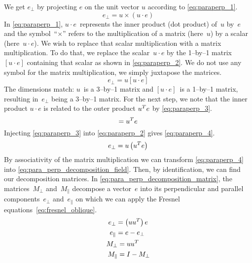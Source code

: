We get $e_\perp$ by projecting $e$ on the unit vector $u$ according to \cref{eq:paraperp_1}.
\begin{equation}
    e_\perp = u \times (u \cdot e) \label{eq:paraperp_1}
\end{equation}
In \cref{eq:paraperp_1}, $u \cdot e$~represents the inner product (dot product) of~$u$ by~$e$ and the symbol~``$\times$'' refers to the multiplication of a matrix (here~$u$) by a scalar (here~$u \cdot e$).
We wish to replace that scalar multiplication with a matrix multiplication.
To do that, we replace the scalar~$u \cdot e$ by the 1--by--1 matrix~$[u \cdot e]$ containing that scalar as shown in \cref{eq:paraperp_2}.
We do not use any symbol for the matrix multiplication, we simply juxtapose the matrices.
\begin{equation}
    e_\perp = u [u \cdot e] \label{eq:paraperp_2}
\end{equation}
The dimensions match: $u$~is a 3--by--1 matrix and $[u \cdot e]$~is a 1--by--1 matrix, resulting in~$e_\perp$ being a 3--by--1 matrix.
For the next step, we note that the inner product $u \cdot e$ is related to the outer product $u^T e$ by \cref{eq:paraperp_3}.
\begin{equation}
    [u \cdot e] = u\transp e \label{eq:paraperp_3}
\end{equation}
Injecting \cref{eq:paraperp_3} into \cref{eq:paraperp_2} gives \cref{eq:paraperp_4}.
\begin{equation}
    e_\perp = u \left( u^T e \right) \label{eq:paraperp_4}
\end{equation}
By associativity of the matrix multiplication we can transform \cref{eq:paraperp_4} into \cref{eq:para_perp_decomposition_field}.
Then, by identification, we can find our decomposition matrices.
In \cref{eq:para_perp_decomposition_matrix}, the matrices~$M_\perp$ and~$M_\parallel$ decompose a vector~$e$ into its perpendicular and parallel components~$e_\perp$ and~$e_\parallel$ on which we can apply the Fresnel equations~\eqref{eq:fresnel_oblique}.
\begin{gather}
    \begin{aligned}
        e_\perp &= \left(u u^T \right) e
        \\
        e_\parallel &= e - e_\perp
    \end{aligned}
    \label{eq:para_perp_decomposition_field}
    \\
    \begin{aligned}
        M_\perp &= u u^T   \\
        M_\parallel & = I - M_\perp
    \end{aligned}
    \label{eq:para_perp_decomposition_matrix}
\end{gather}

